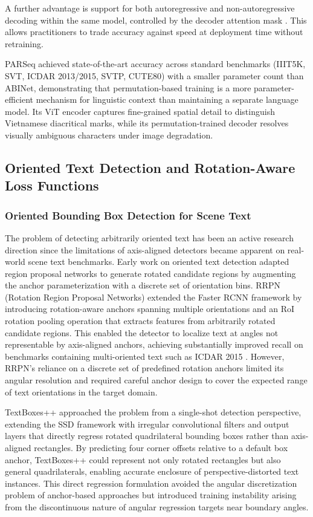 A further advantage is support for both autoregressive and non-autoregressive decoding within the same model, controlled by the decoder attention mask \cite{Bautista2022}. This allows practitioners to trade accuracy against speed at deployment time without retraining.

PARSeq achieved state-of-the-art accuracy across standard benchmarks (IIIT5K, SVT, ICDAR 2013/2015, SVTP, CUTE80) with a smaller parameter count than ABINet, demonstrating that permutation-based training is a more parameter-efficient mechanism for linguistic context than maintaining a separate language model. Its ViT encoder captures fine-grained spatial detail to distinguish Vietnamese diacritical marks, while its permutation-trained decoder resolves visually ambiguous characters under image degradation.

\subsection{Oriented Text Detection and Rotation-Aware Loss Functions}
\label{sec:oriented_text_detection_and_rotation_aware_loss_functions_2_2_5}

\subsubsection{Oriented Bounding Box Detection for Scene Text}
The problem of detecting arbitrarily oriented text has been an active research direction since the limitations of axis-aligned detectors became apparent on real-world scene text benchmarks. Early work on oriented text detection adapted region proposal networks to generate rotated candidate regions by augmenting the anchor parameterization with a discrete set of orientation bins. RRPN (Rotation Region Proposal Networks) \cite{Ma2018} extended the Faster RCNN framework by introducing rotation-aware anchors spanning multiple orientations and an RoI rotation pooling operation that extracts features from arbitrarily rotated candidate regions. This enabled the detector to localize text at angles not representable by axis-aligned anchors, achieving substantially improved recall on benchmarks containing multi-oriented text such as ICDAR 2015 \cite{Karatzas2015}. However, RRPN's reliance on a discrete set of predefined rotation anchors limited its angular resolution and required careful anchor design to cover the expected range of text orientations in the target domain.

TextBoxes++ \cite{Liao2018} approached the problem from a single-shot detection perspective, extending the SSD framework with irregular convolutional filters and output layers that directly regress rotated quadrilateral bounding boxes rather than axis-aligned rectangles. By predicting four corner offsets relative to a default box anchor, TextBoxes++ could represent not only rotated rectangles but also general quadrilaterals, enabling accurate enclosure of perspective-distorted text instances. This direct regression formulation avoided the angular discretization problem of anchor-based approaches but introduced training instability arising from the discontinuous nature of angular regression targets near boundary angles.

